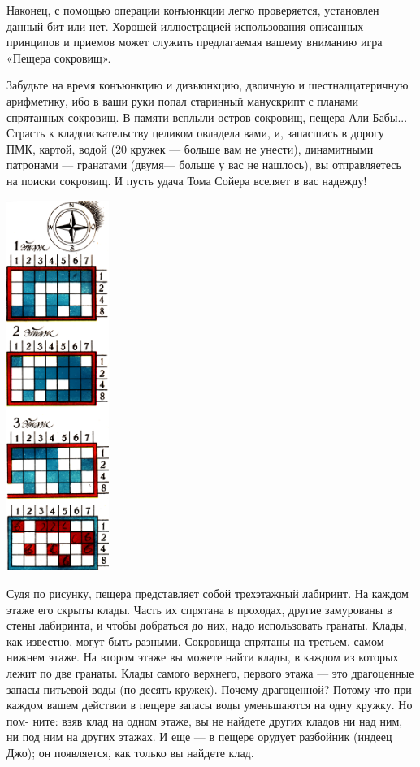 \documentclass[11pt,a4paper,oneside]{article}
\begin{document}
Наконец, с помощью операции конъюнкции легко проверяется, установлен данный бит или нет. Хорошей иллюстрацией использования описанных принципов и приемов может служить предлагаемая вашему вниманию игра «Пещера сокровищ».

Забудьте на время конъюнкцию и дизъюнкцию, двоичную и шестнадцатеричную арифметику, ибо в ваши руки попал старинный манускрипт с планами спрятанных сокровищ. В памяти всплыли остров сокровищ, пещера Али-Бабы... Страсть к кладоискательству целиком овладела вами, и, запасшись в дорогу ПМК, картой, водой (20 кружек — больше вам не унести), динамитными патронами — гранатами (двумя— больше у вас не нашлось), вы отправляетесь на поиски сокровищ. И пусть удача Тома Сойера вселяет в вас надежду!

\includegraphics[width=0.25\textwidth]{treasure2}

Судя по рисунку, пещера представляет собой трехэтажный лабиринт. На каждом этаже его скрыты клады. Часть их спрятана в проходах, другие замурованы в стены лабиринта, и чтобы добраться до них, надо использовать гранаты. Клады, как известно, могут быть разными. Сокровища спрятаны на третьем, самом нижнем этаже. На втором этаже вы можете найти клады, в каждом из которых лежит по две гранаты. Клады самого верхнего, первого этажа — это драгоценные запасы питьевой воды (по десять кружек). Почему драгоценной? Потому что при каждом вашем действии в пещере запасы воды уменьшаются на одну кружку. Но пом- ните: взяв клад на одном этаже, вы не найдете других кладов ни над ним, ни под ним на других этажах. И еще — в пещере орудует разбойник (индеец Джо); он появляется, как только вы найдете клад.
\end{document}
